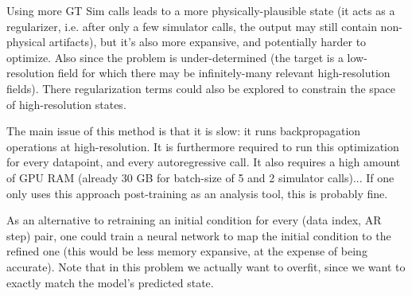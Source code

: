 \documentclass{article}
\begin{document}

Using more GT Sim calls leads to a more physically-plausible state (it acts as a regularizer, i.e. after only a few simulator calls, the output may still contain non-physical artifacts), but it's also more expansive, and potentially harder to optimize. Also since the problem is under-determined (the target is a low-resolution field for which there may be infinitely-many relevant high-resolution fields). There regularization terms could also be explored to constrain the space of high-resolution states.

The main issue of this method is that it is slow: it runs backpropagation operations at high-resolution. It is furthermore required to run this optimization for every datapoint, and every autoregressive call. It also requires a high amount of GPU RAM (already 30 GB for batch-size of 5 and 2 simulator calls)... If one only uses this approach post-training as an analysis tool, this is probably fine. 

As an alternative to retraining an initial condition for every (data index, AR step) pair, one could train a neural network to map the initial condition to the refined one (this would be less memory expansive, at the expense of being accurate). Note that in this problem we actually want to overfit, since we want to exactly match the model's predicted state.
\end{document}
